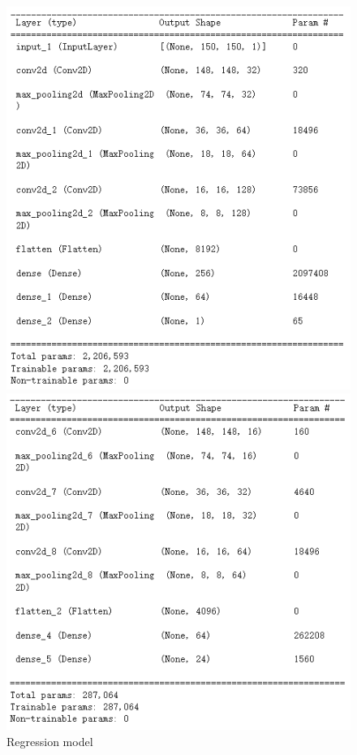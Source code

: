 \documentclass{article}
\begin{document}
\begin{figure}[!h]
	\centering
	\begin{minipage}[t]{0.3\textwidth}%
		\centering
		\includegraphics[width=\textwidth]{regression.png}
		\caption{Regression model}
		\label{fig:regression}
	\end{minipage}
	\begin{minipage}[t]{0.3\textwidth}%
		\centering
		\includegraphics[width=\textwidth]{classification.png}

\end{minipage}
\end{figure}
\end{document}
